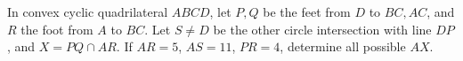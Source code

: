 In convex cyclic quadrilateral $ABCD$, let $P,Q$ be the feet from $D$ to $BC,AC$, and $R$ the foot from $A$ to $BC$. Let $S\ne D$ be the other circle intersection with line $DP$, and $X=PQ\cap AR$. If $AR=5$, $AS=11$, $PR=4$, determine all possible $AX$.
